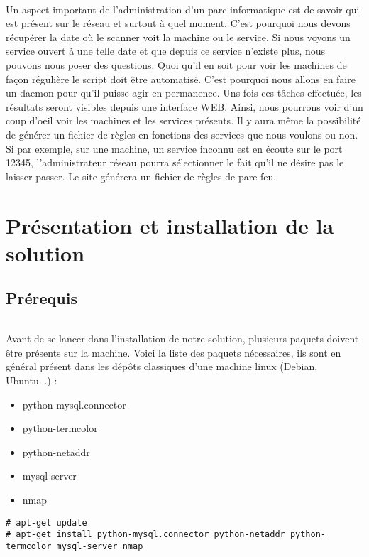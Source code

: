 \documentclass[12pt]{report}
\begin{document}
		\paragraph{}
			Un aspect important de l'administration d'un parc informatique est de savoir qui est présent sur le réseau et surtout à quel moment. C'est pourquoi nous devons récupérer la date où le scanner voit la machine ou le service. Si nous voyons un service ouvert à une telle date et que depuis ce service n'existe plus, nous pouvons nous poser des questions. Quoi qu'il en soit pour voir les machines de façon régulière le script doit être automatisé. C'est pourquoi nous allons en faire un daemon pour qu'il puisse agir en permanence. Uns fois ces tâches effectuée, les résultats seront visibles depuis une interface WEB. Ainsi, nous pourrons voir d'un coup d'oeil voir les machines et les services présents. Il y aura même la possibilité de générer un fichier de règles en fonctions des services que nous voulons ou non. Si par exemple, sur une machine, un service inconnu est en écoute sur le port 12345, l'administrateur réseau pourra sélectionner le fait qu'il ne désire pas le laisser passer. Le site générera un fichier de règles de pare-feu.
\part{Présentation et installation de la solution}
	\chapter{Prérequis}
		\paragraph{}
			Avant de se lancer dans l'installation de notre solution, plusieurs paquets doivent être présents sur la machine. Voici la liste des paquets nécessaires, ils sont en général présent dans les dépôts classiques d'une machine linux (Debian, Ubuntu...) :
			\begin{itemize}
				\item python-mysql.connector
				\item python-termcolor
				\item python-netaddr
				\item mysql-server
				\item nmap
			\end{itemize}
			\begin{lstlisting}[caption=Installation des paquets nécessaires, captionpos=b]
# apt-get update
# apt-get install python-mysql.connector python-netaddr python-termcolor mysql-server nmap
			\end{lstlisting}
\end{document}
